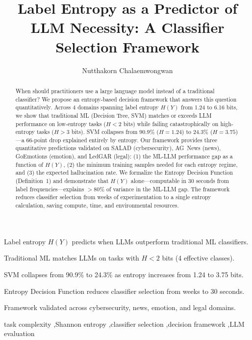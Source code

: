 \documentclass[review,3p]{elsarticle}
\begin{document}
\title{Label Entropy as a Predictor of LLM Necessity: A Classifier Selection Framework}

\author[kmitl]{Nutthakorn Chalaemwongwan}
\address[kmitl]{Department of Computer Engineering, KOSEN-KMITL, King Mongkut's Institute of Technology Ladkrabang, Bangkok, Thailand}

\begin{frontmatter}

\begin{highlights}
\item Label entropy $H(Y)$ predicts when LLMs outperform traditional ML classifiers.
\item Traditional ML matches LLMs on tasks with $H < 2$ bits (4 effective classes).
\item SVM collapses from 90.9\% to 24.3\% as entropy increases from 1.24 to 3.75 bits.
\item Entropy Decision Function reduces classifier selection from weeks to 30 seconds.
\item Framework validated across cybersecurity, news, emotion, and legal domains.
\end{highlights}

\begin{abstract}
When should practitioners use a large language model instead of a traditional classifier? We propose an entropy-based decision framework that answers this question quantitatively. Across 4 domains spanning label entropy $H(Y)$ from 1.24 to 6.16 bits, we show that traditional ML (Decision Tree, SVM) matches or exceeds LLM performance on low-entropy tasks ($H < 2$ bits) while failing catastrophically on high-entropy tasks ($H > 3$ bits). SVM collapses from 90.9\% ($H=1.24$) to 24.3\% ($H=3.75$)---a 66-point drop explained entirely by entropy. Our framework provides three quantitative predictions validated on SALAD (cybersecurity), AG~News (news), GoEmotions (emotion), and LedGAR (legal): (1) the ML-LLM performance gap as a function of $H(Y)$, (2) the minimum training samples needed for each entropy regime, and (3) the expected hallucination rate. We formalize the Entropy Decision Function (Definition~1) and demonstrate that $H(Y)$ alone---computable in 30 seconds from label frequencies---explains $>$80\% of variance in the ML-LLM gap. The framework reduces classifier selection from weeks of experimentation to a single entropy calculation, saving compute, time, and environmental resources.
\end{abstract}

\begin{keyword}
task complexity \sep Shannon entropy \sep classifier selection \sep decision framework \sep LLM evaluation
\end{keyword}

\end{frontmatter}
\end{document}
